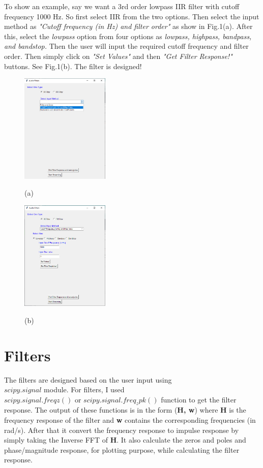 \documentclass{article}
\begin{document}
To show an example, say we want a 3rd order lowpass IIR filter with cutoff frequency 1000 Hz. So first select IIR from the two options. Then select the input method as \emph{"Cutoff frequency (in Hz) and filter order"} as show in Fig.1(a). After this, select the \emph{lowpass} option from four options as \emph{lowpass, highpass, bandpass, and bandstop.}
Then the user will input the required cutoff frequency and filter order. Then simply click on \emph{"Set Values"} and then \emph{"Get Filter Response!"} buttons. See Fig.1(b). The filter is designed!
\begin{figure}[htb]

\begin{minipage}[b]{0.48\linewidth}
  \centering
  \centerline{\includegraphics[width=4.2cm]{1}}
  \centerline{(a)}\medskip
\end{minipage}
%
\hfill
\begin{minipage}[b]{0.48\linewidth}
  \centering
  \centerline{\includegraphics[width=4.2cm]{2}}
  \centerline{(b)}\medskip
\end{minipage}
%
\caption{}
\label{fig:fig1}
%
\end{figure}


\section{Filters}
\label{sec:filters}
The filters are designed based on the user input using\\
$scipy.signal$ module. For filters, I used \\$scipy.signal.freqz()$ or $scipy.signal.freq_zpk()$ function to get the filter response. The output of these functions is in the form ({\bf H, w}) where {\bf H} is the frequency response of the filter and {\bf w} contains the corresponding frequencies (in rad/s). After that it convert the frequency response to impulse response by simply taking the Inverse FFT of {\bf H}. It also calculate the zeros and poles and phase/magnitude response, for plotting purpose, while calculating the filter response. 
\end{document}
